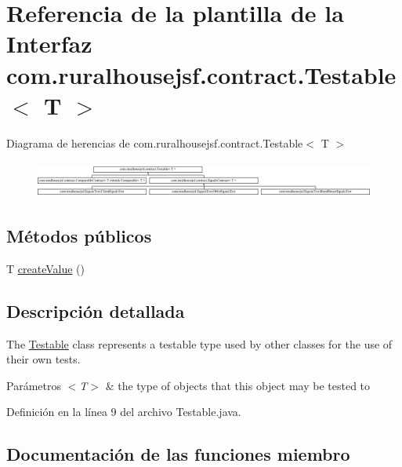\hypertarget{interfacecom_1_1ruralhousejsf_1_1contract_1_1_testable}{}\section{Referencia de la plantilla de la Interfaz com.\+ruralhousejsf.\+contract.\+Testable$<$ T $>$}
\label{interfacecom_1_1ruralhousejsf_1_1contract_1_1_testable}
Diagrama de herencias de com.\+ruralhousejsf.\+contract.\+Testable$<$ T $>$\begin{figure}[H]
\begin{center}
\leavevmode
\includegraphics[height=1.212121cm]{d8/db5/interfacecom_1_1ruralhousejsf_1_1contract_1_1_testable}
\end{center}
\end{figure}
\subsection*{Métodos públicos}
\begin{DoxyCompactItemize}
\item 
T \mbox{\hyperlink{interfacecom_1_1ruralhousejsf_1_1contract_1_1_testable_ae4546a381488faaba1ef7c0f8688de9c}{create\+Value}} ()
\end{DoxyCompactItemize}


\subsection{Descripción detallada}
The \mbox{\hyperlink{interfacecom_1_1ruralhousejsf_1_1contract_1_1_testable}{Testable}} class represents a testable type used by other classes for the use of their own tests.


\begin{DoxyParams}{Parámetros}
{\em $<$\+T$>$} & the type of objects that this object may be tested to \\
\hline
\end{DoxyParams}


Definición en la línea 9 del archivo Testable.\+java.



\subsection{Documentación de las funciones miembro}
\mbox{\label{interfacecom_1_1ruralhousejsf_1_1contract_1_1_testable_ae4546a381488faaba1ef7c0f8688de9c}} 
